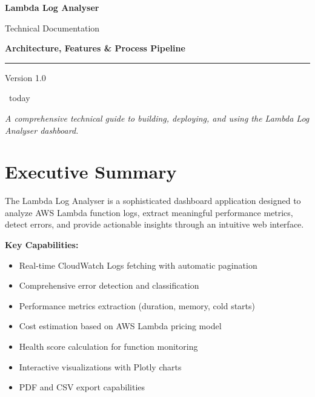 \documentclass[12pt,a4paper]{article}
\begin{document}
\begin{titlepage}
    \centering
    \vspace*{2cm}
    
    {\Huge\bfseries\color{primary} Lambda Log Analyser\par}
    \vspace{0.5cm}
    {\LARGE\color{secondary} Technical Documentation\par}
    \vspace{2cm}
    
    {\Large\bfseries Architecture, Features \& Process Pipeline\par}
    \vspace{1cm}
    
    \rule{0.8\textwidth}{0.5pt}
    
    \vspace{2cm}
    {\large Version 1.0\par}
    \vspace{1cm}
    {\large\ today\par}
    
    \vfill
    {\itshape\color{gray} A comprehensive technical guide to building, deploying, and using the Lambda Log Analyser dashboard.\par}
\end{titlepage}

\pagebreak
\tableofcontents
\pagebreak

\section{Executive Summary}

The Lambda Log Analyser is a sophisticated dashboard application designed to analyze AWS Lambda function logs, extract meaningful performance metrics, detect errors, and provide actionable insights through an intuitive web interface.

\bigskip
\noindent\textbf{Key Capabilities:}
\begin{itemize}
    \item Real-time CloudWatch Logs fetching with automatic pagination
    \item Comprehensive error detection and classification
    \item Performance metrics extraction (duration, memory, cold starts)
    \item Cost estimation based on AWS Lambda pricing model
    \item Health score calculation for function monitoring
    \item Interactive visualizations with Plotly charts
    \item PDF and CSV export capabilities
\end{itemize}
\end{document}
